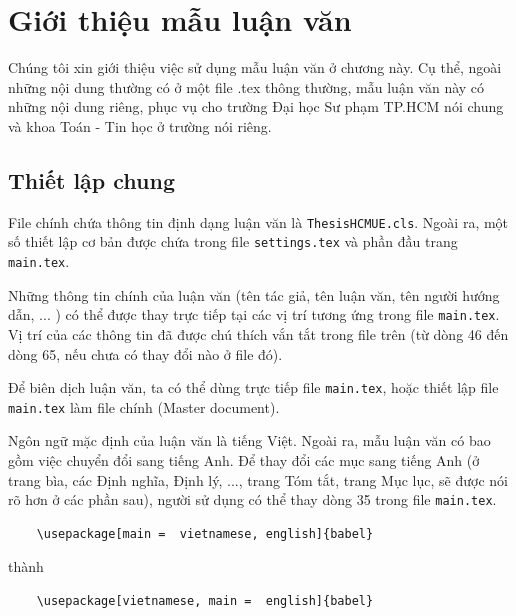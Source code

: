 \chapter{Giới thiệu mẫu luận văn}
\label{chap_huongdan} %

\newcommand{\keyword}[1]{\textbf{#1}}
\newcommand{\tabhead}[1]{\textbf{#1}}
\newcommand{\code}[1]{\texttt{#1}}
\newcommand{\file}[1]{\texttt{\bfseries#1}}
\newcommand{\option}[1]{\texttt{\itshape#1}}

Chúng tôi xin giới thiệu việc sử dụng mẫu luận văn ở chương này. Cụ thể, ngoài những nội dung thường có ở một file .tex thông thường, mẫu luận văn này có những nội dung riêng, phục vụ cho trường Đại học Sư phạm TP.HCM nói chung và khoa Toán - Tin học ở trường nói riêng.

\section{Thiết lập chung}
File chính chứa thông tin định dạng luận văn là {\tt ThesisHCMUE.cls}. Ngoài ra, một số thiết lập cơ bản được chứa trong file {\tt settings.tex} và phần đầu trang {\tt main.tex}.

Những thông tin chính của luận văn (tên tác giả, tên luận văn, tên người hướng dẫn, ... ) có thể được thay trực tiếp tại các vị trí tương ứng trong file {\tt main.tex}. Vị trí của các thông tin đã được chú thích vắn tắt trong file trên (từ dòng 46 đến dòng 65, nếu chưa có thay đổi nào ở file đó).

Để biên dịch luận văn, ta có thể dùng trực tiếp file {\tt main.tex}, hoặc thiết lập file {\tt main.tex} làm file chính (Master document).

Ngôn ngữ mặc định của luận văn là tiếng Việt. Ngoài ra, mẫu luận văn có bao gồm việc chuyển đổi sang tiếng Anh. Để thay đổi các mục sang tiếng Anh (ở trang bìa, các Định nghĩa, Định lý, ..., trang Tóm tắt, trang Mục lục, sẽ được nói rõ hơn ở các phần sau), người sử dụng có thể thay dòng 35 trong file {\tt main.tex}.

\begin{verbatim}
    \usepackage[main =  vietnamese, english]{babel}
\end{verbatim}
thành
\begin{verbatim}
    \usepackage[vietnamese, main =  english]{babel}
\end{verbatim}

